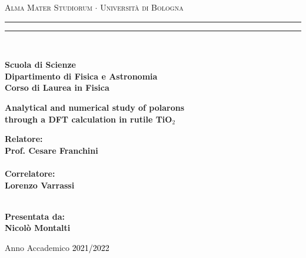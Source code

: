 \begin{titlepage}


    \begin{center}
        {{\Large{\textsc{Alma Mater Studiorum $\cdot$ Universit\`a di Bologna}}}}
        \rule[0.1cm]{15.8cm}{0.1mm}
        \rule[0.5cm]{15.8cm}{0.6mm}
        \\\vspace{3mm}

        {\small{\bf Scuola di Scienze \\
                Dipartimento di Fisica e Astronomia\\
                Corso di Laurea in Fisica}}

    \end{center}

    \vspace{23mm}
    \centering
    \begin{center}%
        {\LARGE{\bf Analytical and numerical study of polarons \\ through  a DFT calculation in rutile TiO$_2$}}\\
    \end{center}

    \vspace{50mm} \par \noindent

    \begin{minipage}[t]{0.47\textwidth}
        {\large{\bf Relatore:
                \vspace{2mm}\\
                Prof. Cesare Franchini}} \\\\
        \bf Correlatore:
        \vspace{2mm}\\
        Lorenzo Varrassi\\\\
    \end{minipage}
    \hfill
    \begin{minipage}[t]{0.47\textwidth}\raggedleft
        {\large{\bf Presentata da:
                \\
                \vspace{2mm}
                Nicolò Montalti}}
    \end{minipage}

    \vfill

    \begin{center}
        Anno Accademico \textcolor{black}{2021/2022}
    \end{center}

\end{titlepage}
\restoregeometry